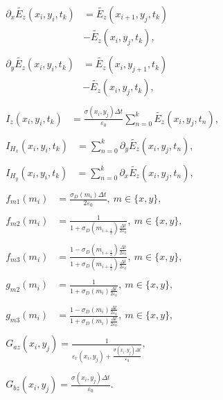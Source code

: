 \documentclass[12pt,twocolumn]{article}
\begin{document}
\begin{subequations}
\begin{align}
&\begin{aligned}
\partial_x\tilde{E_z}(x_i,y_i,t_k) &= \tilde{E_z}(x_{i+1},y_j,t_k)\\&-\tilde{E_z}(x_i,y_j,t_k),
\end{aligned}\\
&\begin{aligned}
\partial_y\tilde{E_z}(x_i,y_i,t_k) &= \tilde{E_z}(x_i,y_{j+1},t_k)\\&-\tilde{E_z}(x_i,y_j,t_k),
\end{aligned}\\
&\begin{aligned}
I_{z}(x_i,y_i,t_k) &= \frac{\sigma(x_i,y_j)\Delta t}{\varepsilon_0}\sum_{n=0}^k\tilde{E_z}(x_i,y_j,t_n),
\end{aligned}\\
&\begin{aligned}
I_{H_x}(x_i,y_i,t_k) &= \sum_{n=0}^k\partial_y\tilde{E_z}(x_i,y_j,t_n),
\end{aligned}\\
&\begin{aligned}
I_{H_y}(x_i,y_i,t_k) &= \sum_{n=0}^k\partial_x\tilde{E_z}(x_i,y_j,t_n),
\end{aligned}\\
&\begin{aligned}
f_{m1}(m_i) &= \frac{\sigma_D(m_i) \Delta t}{2\varepsilon_0},~m\in\{x,y\},
\end{aligned}\\
&\begin{aligned}
f_{m2}(m_i) &= \frac{1}{1+\sigma_D(m_{i+\frac{1}{2}})\frac{\Delta t}{2\varepsilon_0}},~m\in\{x,y\},
\end{aligned}\\
&\begin{aligned}
f_{m3}(m_i) &= \frac{1-\sigma_D(m_{i+\frac{1}{2}})\frac{\Delta t}{2\varepsilon_0}}{1+\sigma_D(m_{i+\frac{1}{2}})\frac{\Delta t}{2\varepsilon_0}},~m\in\{x,y\},
\end{aligned}\\
&\begin{aligned}
g_{m2}(m_i) &= \frac{1}{1+\sigma_D(m_{i})\frac{\Delta t}{2\varepsilon_0}},~m\in\{x,y\},
\end{aligned}\\
&\begin{aligned}
g_{m3}(m_i) &= \frac{1-\sigma_D(m_{i})\frac{\Delta t}{2\varepsilon_0}}{1+\sigma_D(m_{i})\frac{\Delta t}{2\varepsilon_0}},~m\in\{x,y\},
\end{aligned}\\
&\begin{aligned}
G_{az}(x_i,y_j) = \frac{1}{\varepsilon_r(x_i,y_j)+\frac{\sigma(x_i,y_j)\Delta t}{\varepsilon_0}},
\end{aligned}\\
&\begin{aligned}
G_{bz}(x_i,y_j) = \frac{\sigma(x_i,y_j)\Delta t}{\varepsilon_0}.
\end{aligned}
\end{align}
\end{subequations}
\end{document}
